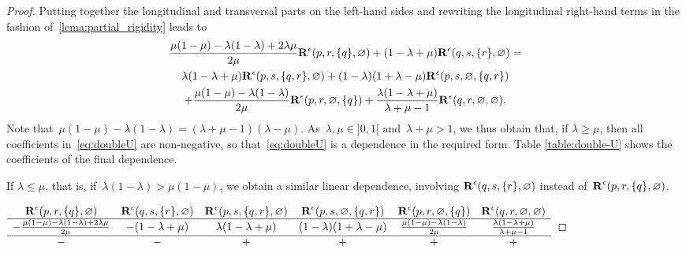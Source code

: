 \documentclass{amsart}
\theoremstyle{definition}
\renewcommand{\b}[1]{{\boldsymbol{#1}}} %
\newcommand{\Rvector}{\b{\rm R}} %
\newcommand{\Reps}{\Rvector^\epsilon} %
\begin{document}
\begin{proof}
Putting together the longitudinal and transversal parts on the left-hand sides and rewriting the longitudinal right-hand terms in the fashion of~\cref{lema:partial_rigidity} leads to
\begin{multline}
\frac{\mu(1-\mu)-\lambda(1-\lambda)+2\lambda\mu}{2\mu} \Reps(p, r, \{q\}, \varnothing) + (1-\lambda+\mu) \Reps(q, s, \{r\}, \varnothing) = \\ \lambda(1-\lambda+\mu) \Reps(p, s, \{q,r\}, \varnothing) + (1-\lambda)(1+\lambda-\mu) \Reps(p, s, \varnothing, \{q,r\}) \\ + \frac{\mu(1-\mu)-\lambda(1-\lambda)}{2\mu} \Reps(p, r, \varnothing, \{q\}) + \frac{\lambda(1-\lambda+\mu)}{\lambda+\mu-1} \Reps(q, r, \varnothing, \varnothing).
\label{eq:doubleU}
\end{multline}
Note that~$\mu(1-\mu)-\lambda(1-\lambda) = (\lambda + \mu -1)(\lambda - \mu)$.
As~$\lambda, \mu \in {]0,1[}$ and~$\lambda + \mu > 1$, we thus obtain that, if $\lambda \ge \mu$, then all coefficients in~\cref{eq:doubleU} are non-negative, so that~\cref{eq:doubleU} is a dependence in the required form.
Table \ref{table:double-U} shows the coefficients of the final dependence.

If $\lambda \le \mu$, that is, if~$\lambda(1-\lambda) > \mu(1-\mu)$, we obtain a similar linear dependence, involving $\Reps(q, s, \{r\}, \varnothing)$ instead of~$\Reps(p, r, \{q\}, \varnothing)$.

\begin{table}[htb]
\centerline{
$
\begin{array}{cccccc}
\Reps(p, r,  \{q\}, \varnothing)&\Reps(q, s, \{r\}, \varnothing) &
\Reps(p, s, \{q,r\}, \varnothing)&\Reps(p, s, \varnothing, \{q,r\}) &  \Reps(p, r, \varnothing, \{q\}) &  \Reps(q, r, \varnothing, \varnothing)\\
\hline
  - \frac{\mu(1-\mu)-\lambda(1-\lambda)+2\lambda\mu}{2\mu} 
 & -(1-\lambda+\mu) 
 & \lambda(1-\lambda+\mu) 
 & (1-\lambda)(1+\lambda-\mu)
 & \frac{\mu(1-\mu)-\lambda(1-\lambda)}{2\mu}
 & \frac{\lambda(1-\lambda+\mu)}{\lambda+\mu-1}\\
 \hline
  - & - & + & + & + &  + \\
\end{array}
$
}
\caption{The linear dependence~\eqref{eq:doubleU} of \cref{prop:fundamentalDependence} for a double-U, assuming $\lambda \ge \mu$.}
\label{table:double-U}
\end{table}




\end{proof}
\end{document}
